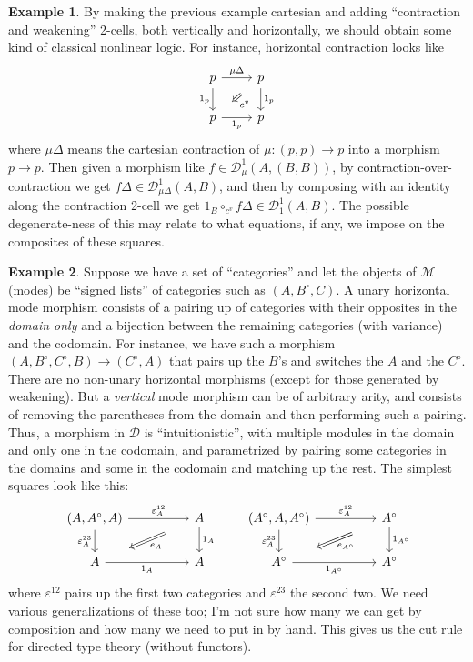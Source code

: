 \documentclass{article}
\theoremstyle{definition}
\newtheorem{eg}{Example}
\def\M{\mathcal{M}}
\def\D{\mathcal{D}}
\def\DD#1#2{\mathcal{D}^{#1}_{#2}}
\def\o{^{\circ}}
\def\twocell#1#2#3{\ar[from=#1,to=#2,phantom,""{name=1,near start},""{name=2,near end}]\ar[Rightarrow,from=1,to=2,"#3"]}
\def\drtwocell{\twocell{r}{d}}
\begin{document}
\begin{eg}\label{eg:nonlinear}
  By making the previous example cartesian and adding ``contraction and weakening'' 2-cells, both vertically and horizontally, we should obtain some kind of classical nonlinear logic.
  For instance, horizontal contraction looks like
  \[\begin{tikzcd}
    p \ar[r,"\mu \Delta"] \ar[d,swap,"1_p"] \drtwocell{c^v}
    & p \ar[d,"1_p"]
    \\ p \ar[r,swap,"1_p"] & p
  \end{tikzcd}\]
  where $\mu\Delta$ means the cartesian contraction of $\mu:(p,p)\to p$ into a morphism $p\to p$.
  Then given a morphism like $f\in \DD{1}{\mu}(A,(B,B))$, by contraction-over-contraction we get $f\Delta \in \DD{1}{\mu\Delta}(A,B)$, and then by composing with an identity along the contraction 2-cell we get $1_B \circ_{c^v} f\Delta \in \DD{1}{1}(A,B)$.
  The possible degenerate-ness of this may relate to what equations, if any, we impose on the composites of these squares.
\end{eg}

\begin{eg}\label{eg:dirtt}
  Suppose we have a set of ``categories'' and let the objects of $\M$ (modes) be ``signed lists'' of categories such as $(A,B\o,C)$.
  A unary horizontal mode morphism consists of a pairing up of categories with their opposites in the \emph{domain only} and a bijection between the remaining categories (with variance) and the codomain.
  For instance, we have such a morphism $(A,B\o,C\o,B) \to (C\o,A)$ that pairs up the $B$'s and switches the $A$ and the $C\o$.
  There are no non-unary horizontal morphisms (except for those generated by weakening).
  But a \emph{vertical} mode morphism can be of arbitrary arity, and consists of removing the parentheses from the domain and then performing such a pairing.
  Thus, a morphism in $\D$ is ``intuitionistic'', with multiple modules in the domain and only one in the codomain, and parametrized by pairing some categories in the domains and some in the codomain and matching up the rest.
  The simplest squares look like this:
  \[\begin{tikzcd}[column sep=huge]
    (A,A\o,A) \ar[r,"\varepsilon^{12}_A"] \ar[d,swap,"\varepsilon^{23}_A"] \drtwocell{e_A}
    & A \ar[d,"1_A"]
    \\ A \ar[r,swap,"1_A"] & A
  \end{tikzcd}
  \qquad
  \begin{tikzcd}[column sep=huge]
    (A\o,A,A\o) \ar[r,"\varepsilon^{12}_A"] \ar[d,swap,"\varepsilon^{23}_A"] \drtwocell{e_{A\o}}
    & A\o \ar[d,"1_{A\o}"]
    \\ A\o \ar[r,swap,"1_{A\o}"] & A\o
  \end{tikzcd}\]
  where $\varepsilon^{12}$ pairs up the first two categories and $\varepsilon^{23}$ the second two.
  We need various generalizations of these too; I'm not sure how many we can get by composition and how many we need to put in by hand.
  This gives us the cut rule for directed type theory (without functors).
\end{eg}
\end{document}
